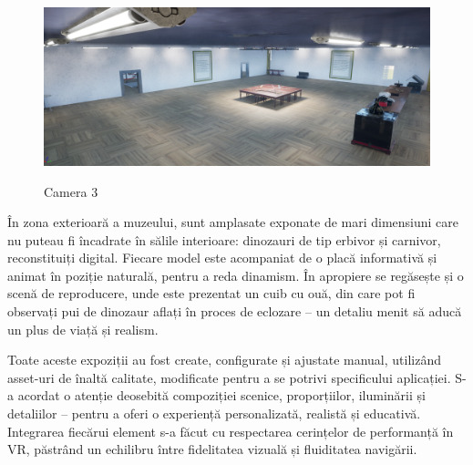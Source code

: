 \begin{figure} [htp] 
\centering 
\includegraphics [width=12cm]
{continut/capitol3/figuri/iteme.png} 
\label{fig:Room3} 
    \caption{Camera 3}
\end{figure}

În zona exterioară a muzeului, sunt amplasate exponate de mari dimensiuni care nu puteau fi încadrate în sălile interioare: dinozauri de tip erbivor și carnivor, reconstituiți digital. Fiecare model este acompaniat de o placă informativă și animat în poziție naturală, pentru a reda dinamism. În apropiere se regăsește și o scenă de reproducere, unde este prezentat un cuib cu ouă, din care pot fi observați pui de dinozaur aflați în proces de eclozare – un detaliu menit să aducă un plus de viață și realism.

Toate aceste expoziții au fost create, configurate și ajustate manual, utilizând asset-uri de înaltă calitate, modificate pentru a se potrivi specificului aplicației. S-a acordat o atenție deosebită compoziției scenice, proporțiilor, iluminării și detaliilor – pentru a oferi o experiență personalizată, realistă și educativă. Integrarea fiecărui element s-a făcut cu respectarea cerințelor de performanță în VR, păstrând un echilibru între fidelitatea vizuală și fluiditatea navigării.

